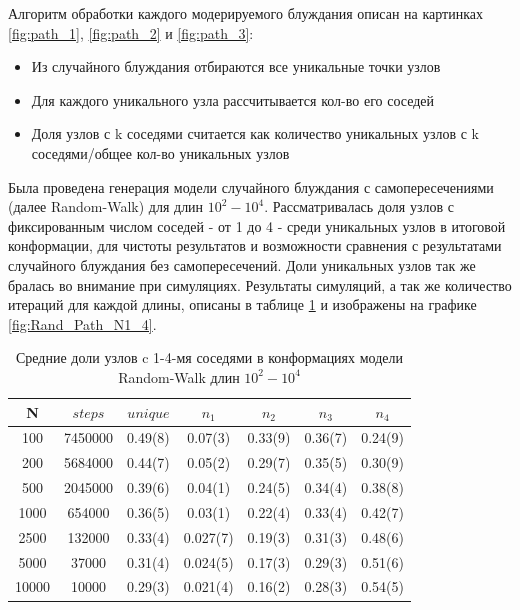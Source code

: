 Алгоритм обработки каждого модерируемого блуждания описан на картинках \ref{fig:path_1}, \ref{fig:path_2} и \ref{fig:path_3}:
\begin{itemize}
    \item Из случайного блуждания отбираются все уникальные точки узлов
    \item Для каждого уникального узла рассчитывается кол-во его соседей 
    \item Доля узлов с k соседями считается как {количество уникальных узлов с k соседями}/{общее кол-во уникальных узлов}
\end{itemize}


Была проведена генерация модели случайного блуждания с самопересечениями (далее Random-Walk) для длин $10^{2}-10^{4}$. Рассматривалась доля узлов с фиксированным числом соседей - от 1 до 4 - среди уникальных узлов в итоговой конформации, для чистоты результатов и возможности сравнения с результатами случайного блуждания без самопересечений. Доли уникальных узлов так же бралась во внимание при симуляциях. Результаты симуляций, а так же количество итераций для каждой длины, описаны в таблице \ref{tab:Ran_Walk_neigh} и изображены на графике \ref{fig:Rand_Path_N1_4}\footnotemark{}.

\begin{table}[h]
    \centering
    \begin{tabular}{|c|c|c|c|c|c|c|}
        \hline
        N & $steps$ & $unique$ & $n_{1}$ & $n_{2}$ & $n_{3}$ & $n_{4}$ \\ \hline
        100 & 7450000 & 0.49(8) & 0.07(3) & 0.33(9) & 0.36(7) & 0.24(9) \\ \hline
        200 & 5684000 & 0.44(7) & 0.05(2) & 0.29(7) & 0.35(5) & 0.30(9) \\ \hline
        500 & 2045000 & 0.39(6) & 0.04(1) & 0.24(5) & 0.34(4) & 0.38(8) \\ \hline
        1000 & 654000 & 0.36(5) & 0.03(1) & 0.22(4) & 0.33(4) & 0.42(7) \\ \hline
        2500 & 132000 & 0.33(4) & 0.027(7) & 0.19(3) & 0.31(3) & 0.48(6)  \\ \hline
        5000 & 37000 & 0.31(4) & 0.024(5) & 0.17(3) & 0.29(3) & 0.51(6) \\ \hline
        10000 & 10000 & 0.29(3) & 0.021(4) & 0.16(2) & 0.28(3) & 0.54(5) \\ \hline
    \end{tabular}
    \caption{Средние доли узлов c 1-4-мя соседями в конформациях модели Random-Walk длин $10^{2}-10^{4}$}
    \label{tab:Ran_Walk_neigh}
\end{table}


